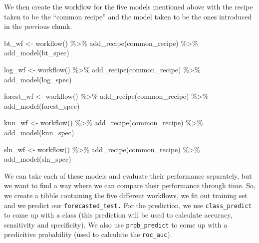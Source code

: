 \documentclass[
]{article}
\newenvironment{Shaded}{\begin{snugshade}}{\end{snugshade}}
\newcommand{\FunctionTok}[1]{\textcolor[rgb]{0.00,0.00,0.00}{#1}}
\newcommand{\NormalTok}[1]{#1}
\newcommand{\OtherTok}[1]{\textcolor[rgb]{0.56,0.35,0.01}{#1}}
\newcommand{\SpecialCharTok}[1]{\textcolor[rgb]{0.00,0.00,0.00}{#1}}
\begin{document}
We then create the workflow for the five models mentioned above with the
recipe taken to be the ``common recipe'' and the model taken to be the
ones introduced in the previous chunk.

\begin{Shaded}
\begin{Highlighting}[]
\NormalTok{bt\_wf }\OtherTok{\textless{}{-}}
  \FunctionTok{workflow}\NormalTok{() }\SpecialCharTok{\%\textgreater{}\%}
  \FunctionTok{add\_recipe}\NormalTok{(common\_recipe) }\SpecialCharTok{\%\textgreater{}\%}
  \FunctionTok{add\_model}\NormalTok{(bt\_spec)}

\NormalTok{log\_wf }\OtherTok{\textless{}{-}}
  \FunctionTok{workflow}\NormalTok{() }\SpecialCharTok{\%\textgreater{}\%}
  \FunctionTok{add\_recipe}\NormalTok{(common\_recipe) }\SpecialCharTok{\%\textgreater{}\%}
  \FunctionTok{add\_model}\NormalTok{(log\_spec)}

\NormalTok{forest\_wf }\OtherTok{\textless{}{-}}
  \FunctionTok{workflow}\NormalTok{() }\SpecialCharTok{\%\textgreater{}\%}
  \FunctionTok{add\_recipe}\NormalTok{(common\_recipe) }\SpecialCharTok{\%\textgreater{}\%}
  \FunctionTok{add\_model}\NormalTok{(forest\_spec)}

\NormalTok{knn\_wf }\OtherTok{\textless{}{-}}
  \FunctionTok{workflow}\NormalTok{() }\SpecialCharTok{\%\textgreater{}\%}
  \FunctionTok{add\_recipe}\NormalTok{(common\_recipe) }\SpecialCharTok{\%\textgreater{}\%}
  \FunctionTok{add\_model}\NormalTok{(knn\_spec)}

\NormalTok{sln\_wf }\OtherTok{\textless{}{-}}
  \FunctionTok{workflow}\NormalTok{() }\SpecialCharTok{\%\textgreater{}\%}
  \FunctionTok{add\_recipe}\NormalTok{(common\_recipe) }\SpecialCharTok{\%\textgreater{}\%}
  \FunctionTok{add\_model}\NormalTok{(sln\_spec)}
\end{Highlighting}
\end{Shaded}

We can take each of these models and evaluate their performance
separately, but we want to find a way where we can compare their
performance through time. So, we create a tibble containing the five
different workflows, we fit out training set and we predict our
\texttt{forecasted\_test.} For the prediction, we use
\texttt{class\_predict} to come up with a class (this prediction will be
used to calculate accuracy, sensitivity and specificity). We also use
\texttt{prob\_predict} to come up with a predicitive probability (used
to calculate the \texttt{roc\_auc}).
\end{document}
